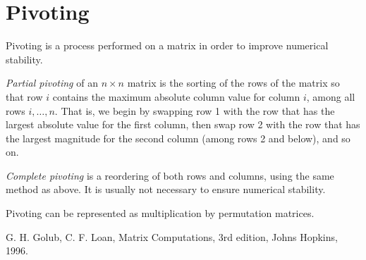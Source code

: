 \documentclass[12pt]{article}
\begin{document}
\section{Pivoting}

Pivoting is a process performed on a matrix in order to improve numerical stability.

\emph{Partial pivoting} of an $n \times n$ matrix is the sorting of the rows of the matrix so that row $i$ contains the maximum absolute column value for column $i$, among all rows $i, \ldots, n$. That is, we begin by swapping row 1 with the row that has the largest absolute value for the first column, then swap row 2 with the row that has the largest magnitude for the second column (among rows 2 and below), and so on.

\emph{Complete pivoting} is a reordering of both rows and columns, using the same method as above.  It is usually not necessary to ensure numerical stability.

Pivoting can be represented as multiplication by permutation matrices.

\begin{thebibliography}{3}
 G. H. Golub, C. F. Loan, Matrix Computations, 3rd edition, Johns Hopkins, 1996.
\end{thebibliography}
\end{document}
